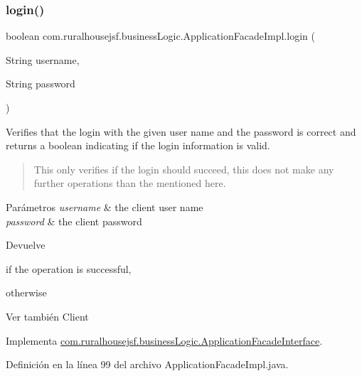 \subsubsection{\texorpdfstring{login()}{login()}}
{\footnotesize\ttfamily boolean com.\+ruralhousejsf.\+business\+Logic.\+Application\+Facade\+Impl.\+login (\begin{DoxyParamCaption}\item[{String}]{username,  }\item[{String}]{password }\end{DoxyParamCaption})}



Verifies that the login with the given user name and the password is correct and returns a boolean indicating if the login information is valid. 

\begin{quote}
This only verifies if the login should succeed, this does not make any further operations than the mentioned here. \end{quote}



\begin{DoxyParams}{Parámetros}
{\em username} & the client user name \\
\hline
{\em password} & the client password\\
\hline
\end{DoxyParams}
\begin{DoxyReturn}{Devuelve}

\begin{DoxyCode}{0}
\DoxyCodeLine{\textcolor{keyword}{true} }
\end{DoxyCode}
 if the operation is successful,
\begin{DoxyCode}{0}
\DoxyCodeLine{\textcolor{keyword}{false} }
\end{DoxyCode}
 otherwise
\end{DoxyReturn}
\begin{DoxySeeAlso}{Ver también}
Client 
\end{DoxySeeAlso}


Implementa \mbox{\hyperlink{a00136_a75cc2d20f7df7b8872333cca281bf343}{com.\+ruralhousejsf.\+business\+Logic.\+Application\+Facade\+Interface}}.



Definición en la línea 99 del archivo Application\+Facade\+Impl.\+java.

\mbox{\label{a00132_a19d9b0706fe39437efc379c3bc747e06}} 
